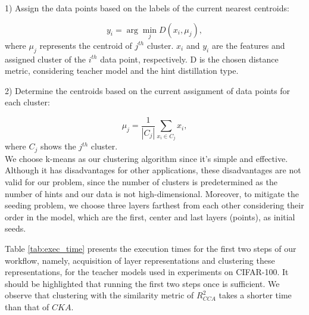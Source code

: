 \documentclass[final,3p,times]{elsarticle}
\begin{document}
1) Assign the data points based on the labels of the current nearest centroids:

\begin{equation}
\label{eq:y_i}
    y_i = \arg\min_j D(x_i, \mu_j),
\end{equation}
where  $\mu_j$ represents the centroid of $j^{th}$ cluster. $x_i$ and $y_i$ are the features and assigned cluster of the $i^{th}$ data point, respectively. D is the chosen distance metric, considering teacher model and the hint distillation type. 


2) Determine the centroids based on the current assignment of data points for each cluster:

\begin{equation} 
\label{eq:mu_j} 
    \mu_j=\frac{1}{|C_j|}\sum_{x_i \in C_j} x_i,  
\end{equation}
where $C_j$ shows the $j^{th}$ cluster.  \\ 

{
We choose k-means as our clustering algorithm since it's simple and effective. Although it has disadvantages for other applications, these disadvantages are not valid for our problem, since the number of clusters is predetermined as the number of hints and our data is not high-dimensional. Moreover, to mitigate the seeding problem, we choose three layers farthest from each other considering their order in the model, which are the first, center and last layers (points), as initial seeds.}

{
Table \ref{tab:exec_time} presents the execution times for the first two steps of our workflow, namely, acquisition of layer representations and clustering these representations, for the teacher models used in experiments on CIFAR-100. It should be highlighted that running the first two steps once is sufficient. We observe that clustering with the similarity metric of $R^2_{CCA}$ takes a shorter time than that of $CKA$.
}
\end{document}
